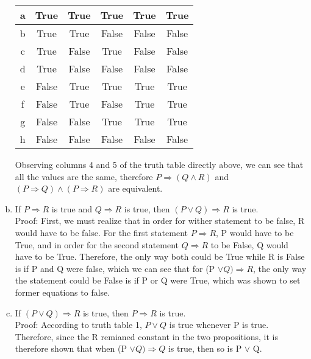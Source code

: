 \documentclass[11pt]{letter}  %
\begin{document}
\begin{enumerate}[(a)]
\begin{center}
\begin{tabular}{c||c|c|c|c|c||}
a & True & True & True & True & True \\ \hline
b & True & True & False & False & False \\ \hline
c & True & False & True & False & False \\ \hline
d & True & False & False & False & False \\ \hline
e & False & True & True & True & True \\ \hline 
f & False & True & False & True & True \\ \hline
g & False & False & True & True & True \\ \hline
h & False & False & False & False & False \\ \hline
\end{tabular}
\end{center} 
Observing columns 4 and 5 of the truth table directly above, we can see that all the values are the same, therefore $P\Rightarrow (Q\wedge R)$ and $\left(P\Rightarrow Q\right)\wedge \left(P\Rightarrow R\right)$ are equivalent.
				\item If $P\Rightarrow R$ is true and $Q\Rightarrow R$ is true, then $\left(P\vee Q\right)\Rightarrow R$ is true. \\
Proof: First, we must realize that in order for wither statement to be false, R would have to be false. For the first statement $P \Rightarrow R$, P would have to be True, and in order for the second statement $Q \Rightarrow R$ to be False, Q would have to be True. Therefore, the only way both could be True while R is False is if P and Q were false, which we can see that for (P $\vee Q) \Rightarrow R$, the only way the statement could be False is if P or Q were True, which was shown to set former equations to false.
				\item If $\left(P\vee Q\right)\Rightarrow R$ is true, then $P\Rightarrow R$ is true. \\
Proof: According to truth table 1, $P \vee Q$ is true whenever P is true. Therefore, since the R remianed constant in the two propositions, it is therefore shown that when (P $\vee  Q) \Rightarrow Q$ is true, then so is P $\vee$ Q. 
			\end{enumerate}
\end{document}
